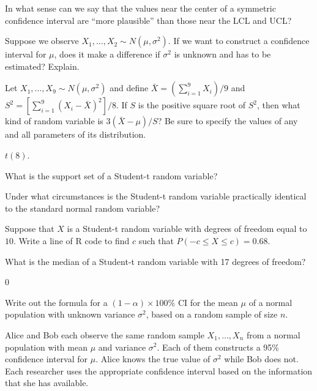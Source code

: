 \documentclass[addpoints,12pt]{exam}
\begin{document}
\begin{questions}
\question In what sense can we say that the values near the center of a symmetric confidence interval are ``more plausible'' than those near the LCL and UCL?

  \question Suppose we observe $X_1, \dots, X_2 \sim N(\mu, \sigma^2)$. If we want to construct a confidence interval for $\mu$, does it make a difference if $\sigma^2$ is unknown and has to be estimated? Explain.

  \question Let $X_1, \dots, X_{9} \sim N(\mu, \sigma^2)$ and define $\bar{X} = (\sum_{i=1}^9 X_i)/9$ and $S^2 = \left[ \sum_{i=1}^9 (X_i - \bar{X})^2 \right]/8$. If $S$ is the positive square root of $S^2$, then what kind of random variable is $3(\bar{X} - \mu)/S$? Be sure to specify the values of any and all parameters of its distribution.
  \begin{solution}
    $t(8)$.
  \end{solution}

  \question What is the support set of a Student-t random variable?

  \question Under what circumstances is the Student-t random variable practically identical to the standard normal random variable?

  \question Suppose that $X$ is a Student-t random variable with degrees of freedom equal to $10$. Write a line of R code to find $c$ such that $P(-c \leq X \leq c) = 0.68$. 

  \question What is the median of a Student-t random variable with 17 degrees of freedom?
  \begin{solution}
    0
  \end{solution}

  \question Write out the formula for a $(1 - \alpha) \times 100\%$ CI for the mean $\mu$ of a normal population with unknown variance $\sigma^2$, based on a random sample of size $n$.

  \question Alice and Bob each observe the same random sample $X_1, \dots, X_n$ from a normal population with mean $\mu$ and variance $\sigma^2$.
  Each of them constructs a 95\% confidence interval for $\mu$.
  Alice knows the true value of $\sigma^2$ while Bob does not.
  Each researcher uses the appropriate confidence interval based on the information that she has available. 
\end{questions}
\end{document}
